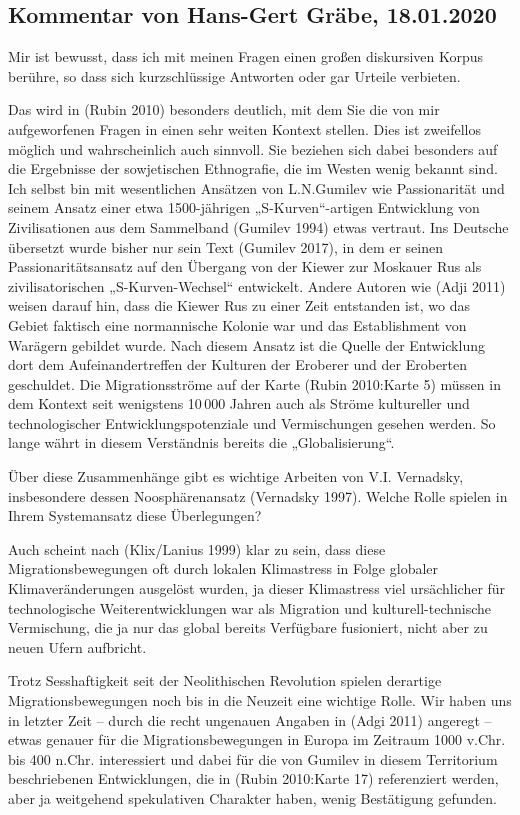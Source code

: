 \documentclass[11pt,a4paper]{article}
\begin{document}
\subsection{Kommentar von Hans-Gert Gräbe, 18.01.2020}

Mir ist bewusst, dass ich mit meinen Fragen einen großen diskursiven Korpus
berühre, so dass sich kurzschlüssige Antworten oder gar Urteile verbieten.

Das wird in (Rubin 2010) besonders deutlich, mit dem Sie die von mir
aufgeworfenen Fragen in einen sehr weiten Kontext stellen. Dies ist zweifellos
möglich und wahrscheinlich auch sinnvoll. Sie beziehen sich dabei besonders
auf die Ergebnisse der sowjetischen Ethnografie, die im Westen wenig bekannt
sind.  Ich selbst bin mit wesentlichen Ansätzen von L.N.Gumilev wie
Passionarität und seinem Ansatz einer etwa 1500-jährigen „S-Kurven“-artigen
Entwicklung von Zivilisationen aus dem Sammelband (Gumilev 1994) etwas
vertraut.  Ins Deutsche übersetzt wurde bisher nur sein Text (Gumilev 2017),
in dem er seinen Passionaritätsansatz auf den Übergang von der Kiewer zur
Moskauer Rus als zivilisatorischen „S-Kurven-Wechsel“ entwickelt.  Andere
Autoren wie (Adji 2011) weisen darauf hin, dass die Kiewer Rus zu einer Zeit
entstanden ist, wo das Gebiet faktisch eine normannische Kolonie war und das
Establishment von Warägern gebildet wurde. Nach diesem Ansatz ist die Quelle
der Entwicklung dort dem Aufeinandertreffen der Kulturen der Eroberer und der
Eroberten geschuldet.  Die Migrationsströme auf der Karte (Rubin 2010:Karte 5)
müssen in dem Kontext seit wenigstens 10\,000 Jahren auch als Ströme
kultureller und technologischer Entwicklungspotenziale und Vermischungen
gesehen werden. So lange währt in diesem Verständnis bereits die
„Globalisierung“. 

Über diese Zusammenhänge gibt es wichtige Arbeiten von V.I. Vernadsky,
insbesondere dessen Noosphärenansatz (Vernadsky 1997). Welche Rolle spielen in
Ihrem Systemansatz diese Überlegungen?

Auch scheint nach (Klix/Lanius 1999) klar zu sein, dass diese
Migrationsbewegungen oft durch lokalen Klimastress in Folge globaler
Klimaveränderungen ausgelöst wurden, ja dieser Klimastress viel ursächlicher
für technologische Weiterentwicklungen war als Migration und
kulturell-technische Vermischung, die ja nur das global bereits Verfügbare
fusioniert, nicht aber zu neuen Ufern aufbricht.

Trotz Sesshaftigkeit seit der Neolithischen Revolution spielen derartige
Migrationsbewegungen noch bis in die Neuzeit eine wichtige Rolle.  Wir haben
uns in letzter Zeit -- durch die recht ungenauen Angaben in (Adgi 2011)
angeregt -- etwas genauer für die Migrationsbewegungen in Europa im Zeitraum
1000 v.Chr. bis 400 n.Chr. interessiert und dabei für die von Gumilev in
diesem Territorium beschriebenen Entwicklungen, die in (Rubin 2010:Karte 17)
referenziert werden, aber ja weitgehend spekulativen Charakter haben, wenig
Bestätigung gefunden.
\end{document}
